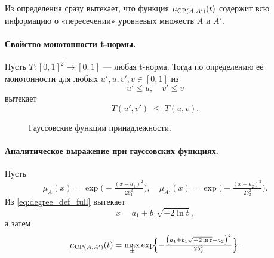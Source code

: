 Из определения сразу вытекает, что функция $\mu_{\operatorname{CP}(A,A')}(t)$ содержит всю информацию о «пересечении» уровневых множеств $A$ и $A'$.

\paragraph{Свойство монотонности t-нормы.}  
Пусть $T\colon[0,1]^2\to[0,1]$ — любая t-норма. Тогда по определению её монотонности для любых $u',u,v',v\in[0,1]$ из
\[
u'\le u,\quad v'\le v
\]
вытекает
\begin{equation}\label{eq:tnorm_monotonicity}
T(u',v') \;\le\; T(u,v).
\end{equation}

\begin{figure}[h]
  \centering
  \caption{Гауссовские функции принадлежности.}
\end{figure}

\paragraph{Аналитическое выражение при гауссовских функциях.}  
Пусть
\[
\mu_A(x)=\exp\!\bigl(-\tfrac{(x-a_1)^2}{2b_1^2}\bigr),\quad
\mu_{A'}(x)=\exp\!\bigl(-\tfrac{(x-a_2)^2}{2b_2^2}\bigr).
\]
Из \eqref{eq:degree_def_full} вытекает
\[
x = a_1 \pm b_1\sqrt{-2\ln t},
\]
а затем
\begin{equation}\label{eq:degree_gauss_full}
\mu_{\operatorname{CP}(A,A')}(t)
=
\max_{\pm}
\exp\!\Bigl\{-\tfrac{\bigl(a_1\pm b_1\sqrt{-2\ln t}-a_2\bigr)^2}{2b_2^2}\Bigr\}.
\end{equation}

